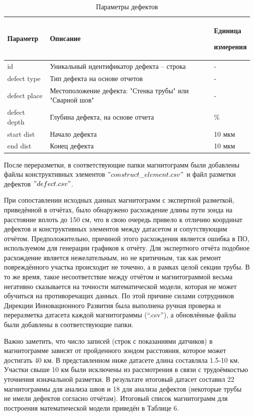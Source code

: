 \documentclass[a4paper,article,14pt]{extarticle}
\begin{document}
\begin{center}
    \begin{longtable}{|p{2cm}|p{12cm}|p{2cm}|}
        \caption{Параметры дефектов}\\\hline
        Параметр & Описание & Единица \par измерения \\ \hline
        id & Уникальный идентификатор дефекта – строка & - \\ \hline
        defect type & Тип дефекта на основе отчетов & - \\ \hline
        defect place & Местоположение дефекта: "Стенка трубы" или "Сварной шов"  & - \\ \hline
        defect depth & Глубина дефекта, на основе отчета  & \% \\ \hline
        start dist & Начало дефекта & 10 мкм \\ \hline
        end dist & Конец дефекта & 10 мкм \\ \hline
    \end{longtable}
\end{center}

После переразметки, в соответствующие папки магнитограмм были добавлены файлы конструктивных элементов 
$"construct\_element.csv"$ и файл разметки дефектов $"defect.csv"$.

При сопоставлении исходных данных магнитограмм с экспертной разметкой, приведённой в отчётах,
 было обнаружено расхождение длины пути зонда на расстояние вплоть до 150 см, что в свою очередь 
 привело к отличию координат дефектов и конструктивных элементов между датасетом и сопутствующим отчётом. 
 Предположительно, причиной этого расхождения является ошибка в ПО, используемом для генерации графиков к отчёту. 
 Для экспертного отчёта подобное расхождение является нежелательным, но не критичным, так как ремонт повреждённого 
 участка происходит не точечно, а в рамках целой секции трубы. В то же время, такое несоответствие между отчётом и 
 магнитограммой весьма негативно сказывается на точности математической модели, которая не может обучиться на противоречащих данных. 
 По этой причине силами сотрудников Дирекции Инновационного Развития была выполнена ручная проверка и переразметка
  датасета каждой магнитограммы (“.csv”), а обновлённые файлы были добавлены в соответствующие папки.

Важно заметить, что число записей (строк с показаниями датчиков) в магнитограмме зависят от пройденного 
зондом расстояния, которое может достигать 40 км. В представленном ниже датасете длина составляла 1.5-10 км. 
Участки свыше 10 км были исключены из рассмотрения в связи с трудоёмкостью уточнения изначальной разметки. 
В результате итоговый датасет составил 22 магнитограммы для анализа швов и 18 для анализа дефектов 
(некоторые трубы не имели дефектов согласно отчётам). Итоговый список магнитограмм для построения 
математической модели приведён в Таблице 6.
\end{document}
